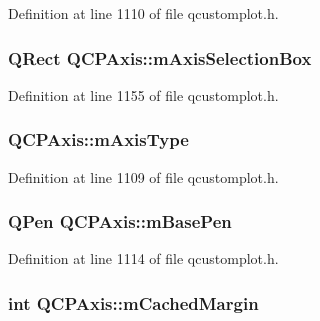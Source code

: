 Definition at line 1110 of file qcustomplot.\-h.

\hypertarget{class_q_c_p_axis_a6185814615059cacf09fdb74a3e539d7}{
\subsubsection[{m\-Axis\-Selection\-Box}]{\setlength{\rightskip}{0pt plus 5cm}Q\-Rect Q\-C\-P\-Axis\-::m\-Axis\-Selection\-Box\hspace{0.3cm}{\ttfamily [protected]}}}\label{class_q_c_p_axis_a6185814615059cacf09fdb74a3e539d7}


Definition at line 1155 of file qcustomplot.\-h.

\hypertarget{class_q_c_p_axis_ae704bf9f2c2b026f08dd4ccad79c616e}{
\subsubsection[{m\-Axis\-Type}]{ Q\-C\-P\-Axis\-::m\-Axis\-Type\hspace{0.3cm}{\ttfamily [protected]}}}\label{class_q_c_p_axis_ae704bf9f2c2b026f08dd4ccad79c616e}


Definition at line 1109 of file qcustomplot.\-h.

\hypertarget{class_q_c_p_axis_ad6b4a0aee9558fb35529e960b8fef72d}{
\subsubsection[{m\-Base\-Pen}]{\setlength{\rightskip}{0pt plus 5cm}Q\-Pen Q\-C\-P\-Axis\-::m\-Base\-Pen\hspace{0.3cm}{\ttfamily [protected]}}}\label{class_q_c_p_axis_ad6b4a0aee9558fb35529e960b8fef72d}


Definition at line 1114 of file qcustomplot.\-h.

\hypertarget{class_q_c_p_axis_a48ace55cbd54f7241e7f1b06fd369b64}{
\subsubsection[{m\-Cached\-Margin}]{\setlength{\rightskip}{0pt plus 5cm}int Q\-C\-P\-Axis\-::m\-Cached\-Margin\hspace{0.3cm}{\ttfamily [protected]}}}\label{class_q_c_p_axis_a48ace55cbd54f7241e7f1b06fd369b64}


